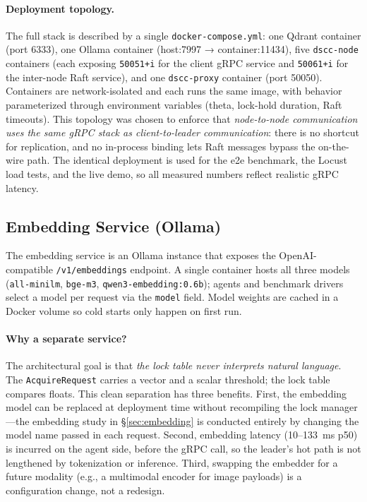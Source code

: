 \documentclass[sigconf]{acmart}
\begin{document}
\paragraph{\textbf{Deployment topology.}}
The full stack is described by a single \texttt{docker-compose.yml}: one
Qdrant container (port 6333), one Ollama container (host:7997 →
container:11434), five \texttt{dscc-node} containers (each exposing
\texttt{50051+i} for the client gRPC service and \texttt{50061+i} for
the inter-node Raft service), and one \texttt{dscc-proxy} container (port
50050). Containers are network-isolated and each runs the same image, with
behavior parameterized through environment variables (theta, lock-hold
duration, Raft timeouts). This topology was chosen to enforce that
\emph{node-to-node communication uses the same gRPC stack as
client-to-leader communication}: there is no shortcut for replication, and
no in-process binding lets Raft messages bypass the on-the-wire path. The
identical deployment is used for the e2e benchmark, the Locust load tests,
and the live demo, so all measured numbers reflect realistic gRPC latency.

\subsection{Embedding Service (Ollama)}
\label{sec:emb-service}

The embedding service is an Ollama instance that exposes the OpenAI-compatible
\texttt{/v1/embeddings} endpoint. A single container hosts all three models
(\texttt{all-minilm}, \texttt{bge-m3}, \texttt{qwen3-embedding:0.6b});
agents and benchmark drivers select a model per request via the
\texttt{model} field. Model weights are cached in a Docker volume so cold
starts only happen on first run.

\paragraph{\textbf{Why a separate service?}}
The architectural goal is that \emph{the lock table never interprets natural
language}. The \texttt{AcquireRequest} carries a vector and a scalar
threshold; the lock table compares floats. This clean separation has three
benefits. First, the embedding model can be replaced at deployment time
without recompiling the lock manager---the embedding study in
\S\ref{sec:embedding} is conducted entirely by changing the model name
passed in each request. Second, embedding latency (10--133~ms p50) is
incurred on the agent side, before the gRPC call, so the leader's hot path
is not lengthened by tokenization or inference. Third, swapping the
embedder for a future modality (e.g., a multimodal encoder for image
payloads) is a configuration change, not a redesign.
\end{document}
